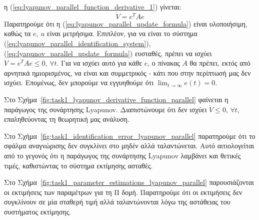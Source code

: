 \documentclass[a4paper,12pt]{article}
\begin{document}
η (\ref{eq:lyapunov_parallel_function_derivative_1}) γίνεται:
\begin{equation}
    \dot{V} = e^TAe
    \label{eq:lyapunov_parallel_function_derivative_2}
\end{equation}
Παρατηρούμε ότι η (\ref{eq:lyapunov_parallel_update_formula}) είναι υλοποιήσιμη, καθώς τα $e$, $u$ είναι 
μετρήσιμα. Επιπλέον, για να είναι το σύστημα (\ref{eq:lyapunov_parallel_identification_system}), 
(\ref{eq:lyapunov_parallel_update_formula}) ευσταθές, πρέπει να ισχύει $\dot{V} = e^T A e \leq 0,\, \forall t$. 
Για να ισχύει αυτό για κάθε $e$, ο πίνακας $A$ θα πρέπει, εκτός από αρνητικά ημιορισμένος, να είναι και 
συμμετρικός - κάτι που στην περίπτωσή μας δεν ισχύει. Επομένως, δεν μπορούμε να εγγυηθούμε ότι 
$\lim_{t \to \infty} e(t) = 0$.

Στο Σχήμα~\ref{fig:task1_lyapunov_derivative_function_parallel} φαίνεται η παράγωγος της συνάρτησης 
Lyapunov. Διαπιστώνουμε ότι δεν ισχύει 
$\dot{V} \leq 0, \, \forall t$, επαληθεύοντας τη θεωρητική μας ανάλυση.

Στο Σχήμα~\ref{fig:task1_identification_error_lyapunov_parallel} παρατηρούμε ότι το σφάλμα αναγνώρισης
δεν συγκλίνει στο μηδέν αλλά ταλαντώνεται. Αυτό αιτιολογείται από το γεγονός ότι η παράγωγος της συνάρτησης 
Lyapunov λαμβάνει και θετικές τιμές, καθιστώντας το σύστημα
εκτίμησης ασταθές.

Στο Σχήμα~\ref{fig:task1_parameter_estimations_lyapunov_parallel} παρουσιάζονται οι εκτιμήσεις των παραμέτρων
για τη Π δομή. Παρατηρούμε ότι οι εκτιμήσεις δεν συγκλίνουν σε μία σταθερή τιμή αλλά ταλαντώνονται λόγω της
αστάθειας του συστήματος εκτίμησης.
\end{document}
